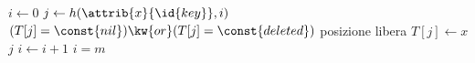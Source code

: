 \begin{codebox}
\li $i \gets 0$
\li \Repeat
\li     $j \gets h(\attrib{x}{\id{key}},i)$
\li     \If $(T[j] = \const{nil}) \kw{ or } (T[j] = \const{deleted})$ 
        \Comment posizione libera
\li         \Then
                $T[j] \gets x$
\li             \Return $j$
            \End
\li     $i \gets i + 1$
\li \Until $i = m$
\li {}
\end{codebox}